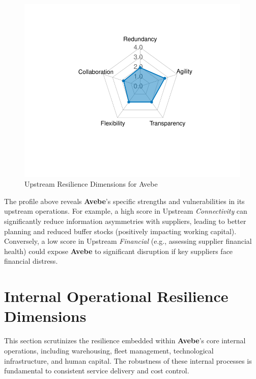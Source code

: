 \documentclass[
  oneside,
  open=any,
  fontsize=11pt]{scrbook}
\begin{document}
\begin{figure}[H]

{\centering \includegraphics[width=0.8\linewidth,height=\textheight,keepaspectratio]{example_3_files/figure-pdf/upstream-radar-chart-1.pdf}

}

\caption{Upstream Resilience Dimensions for Avebe}

\end{figure}%

The profile above reveals \textbf{Avebe}'s specific strengths and
vulnerabilities in its upstream operations. For example, a high score in
Upstream \emph{Connectivity} can significantly reduce information
asymmetries with suppliers, leading to better planning and reduced
buffer stocks (positively impacting working capital). Conversely, a low
score in Upstream \emph{Financial} (e.g., assessing supplier financial
health) could expose \textbf{Avebe} to significant disruption if key
suppliers face financial distress.

\section{Internal Operational Resilience
Dimensions}\label{internal-operational-resilience-dimensions}

This section scrutinizes the resilience embedded within \textbf{Avebe}'s
core internal operations, including warehousing, fleet management,
technological infrastructure, and human capital. The robustness of these
internal processes is fundamental to consistent service delivery and
cost control.
\end{document}
